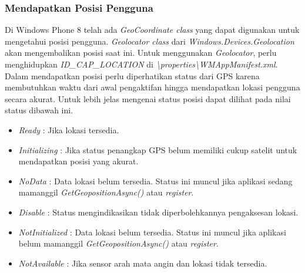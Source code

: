 \subsubsection{Mendapatkan Posisi Pengguna}
\label{subsubsec:Mendapatkan Posisi Pengguna}
\hspace{0.5cm} Di Windows Phone 8 telah ada \textit{GeoCoordinate class} yang dapat digunakan untuk mengetahui posisi pengguna. \textit{Geolocator class} dari \textit{Windows.Devices.Geolocation} akan mengembalikan posisi saat ini. Untuk menggunakan \textit{Geolocator}, perlu menghidupkan \textit{ID\_CAP\_LOCATION} di \textit{\textbackslash properties\textbackslash WMAppManifest.xml}. Dalam mendapatkan posisi perlu diperhatikan status dari GPS karena membutuhkan waktu dari awal pengaktifan hingga mendapatkan lokasi pengguna secara akurat. Untuk lebih jelas mengenai status posisi dapat dilihat pada nilai status dibawah ini.

\begin{itemize}
	\item \textit{Ready} : Jika lokasi tersedia.
	\item \textit{Initializing} : Jika status penangkap GPS belum memiliki cukup satelit untuk mendapatkan posisi yang akurat. 
	\item \textit{NoData} : Data lokasi belum tersedia. Status ini muncul jika aplikasi sedang mamanggil \textit{GetGeopositionAsync()} atau \textit{register}.
	\item \textit{Disable} : Status mengindikasikan tidak diperbolehkannya pengaksesan lokasi.
	\item \textit{NotInitialized} : Data lokasi belum tersedia. Status ini muncul jika aplikasi belum mamanggil \textit{GetGeopositionAsync()} atau \textit{register}.
	\item \textit{NotAvailable} : Jika sensor arah mata angin dan lokasi tidak tersedia.
\end{itemize}


